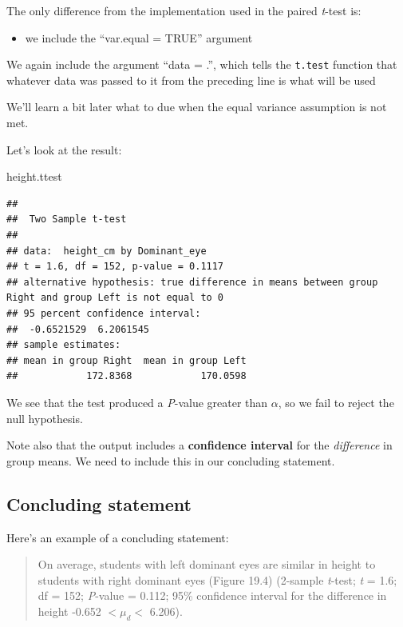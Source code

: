 \documentclass[
]{book}
\newenvironment{Shaded}{\begin{snugshade}}{\end{snugshade}}
\newcommand{\NormalTok}[1]{#1}
\providecommand{\tightlist}{%
  \setlength{\itemsep}{0pt}\setlength{\parskip}{0pt}}
\begin{document}
The only difference from the implementation used in the paired \emph{t}-test is:

\begin{itemize}
\tightlist
\item
  we include the ``var.equal = TRUE'' argument
\end{itemize}

We again include the argument ``data = .'', which tells the \texttt{t.test} function that whatever data was passed to it from the preceding line is what will be used

We'll learn a bit later what to due when the equal variance assumption is not met.

Let's look at the result:

\begin{Shaded}
\begin{Highlighting}[]
\NormalTok{height.ttest}
\end{Highlighting}
\end{Shaded}

\begin{verbatim}
## 
##  Two Sample t-test
## 
## data:  height_cm by Dominant_eye
## t = 1.6, df = 152, p-value = 0.1117
## alternative hypothesis: true difference in means between group Right and group Left is not equal to 0
## 95 percent confidence interval:
##  -0.6521529  6.2061545
## sample estimates:
## mean in group Right  mean in group Left 
##            172.8368            170.0598
\end{verbatim}

We see that the test produced a \emph{P}-value greater than \(\alpha\), so we fail to reject the null hypothesis.

Note also that the output includes a \textbf{confidence interval} for the \emph{difference} in group means. We need to include this in our concluding statement.

\subsection{Concluding statement}\label{concl_2samp}

Here's an example of a concluding statement:

\begin{quote}
On average, students with left dominant eyes are similar in height to students with right dominant eyes (Figure 19.4) (2-sample \emph{t}-test; \emph{t} = 1.6; df = 152; \emph{P}-value = 0.112; 95\% confidence interval for the difference in height -0.652 \(< \mu_d <\) 6.206).
\end{quote}
\end{document}
